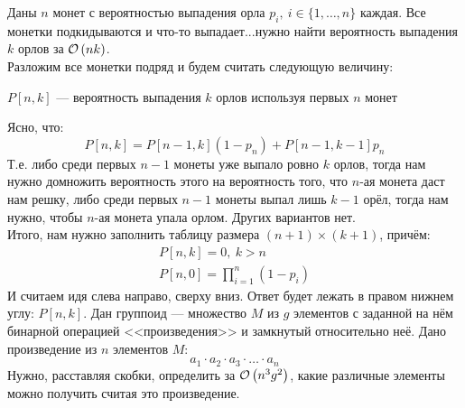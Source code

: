 Даны $n$ монет с вероятностью выпадения орла $p_i,\ i \in \lbrace 1,\ldots,n \rbrace$ каждая. Все монетки подкидываются
и что-то выпадает...нужно найти вероятность выпадения $k$ орлов за $\mathcal{O}\left(nk\right)$.\\
Разложим все монетки подряд и будем считать следующую величину: 
\begin{center}
$P[n,k]$ --- вероятность выпадения $k$ орлов используя первых $n$ монет
\end{center}
Ясно, что:
\[
P[n,k] = P[n-1,k](1-p_n)+P[n-1,k-1]p_n
\]
Т.е. либо среди первых $n-1$ монеты уже выпало ровно $k$ орлов, тогда нам нужно домножить вероятность этого на вероятность
того, что $n$-ая монета даст нам решку, либо среди первых $n-1$ монеты выпал лишь $k-1$ орёл, тогда нам нужно, чтобы 
$n$-ая монета упала орлом. Других вариантов нет.\\
Итого, нам нужно заполнить таблицу размера $(n+1) \times (k+1)$, причём:
\[ 
\begin{array}{c}
P[n,k]=0,\ k > n\\
P[n,0]=\prod_{i=1}^{n}{(1-p_i)} 
\end{array}
\]
И считаем идя слева направо, сверху вниз. Ответ будет лежать в правом нижнем углу: $P[n,k]$. \xqed
{}
Дан группоид --- множество $M$ из $g$ элементов с заданной на нём бинарной операцией <<произведения>> и 
замкнутый относительно неё. Дано произведение из $n$ элементов $M$:
\[
	a_1\cdot a_2 \cdot a_3 \cdot \ldots \cdot a_n
\]
Нужно, расставляя скобки, определить за $\mathcal{O}\left(n^3g^2\right)$, какие различные элементы можно получить считая это произведение.
